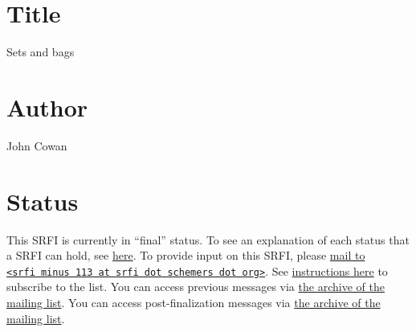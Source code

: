 \section{Title}\label{title}

Sets and bags

\section{Author}\label{author}

John Cowan

\section{Status}\label{status}

This SRFI is currently in ``final'' status. To see an explanation of
each status that a SRFI can hold, see
\href{http://srfi.schemers.org/srfi-process.html}{here}. To provide
input on this SRFI, please
\href{mailto:srfi\%20minus\%20113\%20at\%20srfi\%20dot\%20schemers\%20dot\%20org}{mail
to
\texttt{\textless{}srfi\ minus\ 113\ at\ srfi\ dot\ schemers\ dot\ org\textgreater{}}}.
See \href{../srfi-list-subscribe.html}{instructions here} to subscribe
to the list. You can access previous messages via
\href{mail-archive/maillist.html}{the archive of the mailing list}. You
can access post-finalization messages via
\href{http://srfi.schemers.org/srfi-111/post-mail-archive/maillist.html}{the
archive of the mailing list}.

